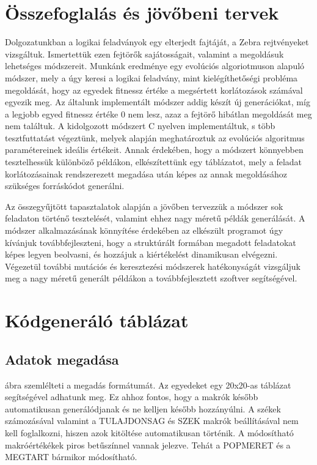 \documentclass[12pt,a4paper,oneside]{report}
\begin{document}
\chapter{Összefoglalás és jövőbeni tervek} %
    Dolgozatunkban a logikai feladványok egy elterjedt fajtáját, a Zebra rejtvényeket vizsgáltuk.
    Ismertettük ezen fejtörők sajátosságait, valamint a megoldásuk lehetséges módszereit.
    Munkánk eredménye egy evolúciós algoriotmuson alapuló módszer, mely a úgy keresi a logikai feladvány, mint kielégíthetőségi probléma megoldását, hogy az egyedek fitnessz értéke a megsértett korlátozások számával egyezik meg.
    Az általunk implementált módszer addig készít új generációkat, míg a legjobb egyed fitnessz értéke 0 nem lesz, azaz a fejtörő hibátlan megoldását meg nem találtuk.
    A kidolgozott módszert C nyelven implementáltuk, s több tesztfuttatást végeztünk, melyek alapján meghatároztuk az evolúciós algoritmus paramétereinek ideális értékeit.
    Annak érdekében, hogy a módszert könnyebben tesztelhessük különböző példákon, elkészítettünk egy táblázatot, mely a feladat korlátozásainak rendszerezett megadása után képes az annak megoldásához szükséges forráskódot generálni.

    Az összegyűjtött tapasztalatok alapján a jövőben tervezzük a módszer sok feladaton történő tesztelését, valamint ehhez nagy méretű példák generálását.
    A módszer alkalmazásának könnyítése érdekében az elkészült programot úgy kívánjuk továbbfejleszteni, hogy a struktúrált formában megadott feladatokat képes legyen beolvasni, és hozzájuk a kiértékelést dinamikusan elvégezni.
    Végezetül további mutációs és keresztezési módszerek hatékonyságát vizsgáljuk meg a nagy méretű generált példákon a továbbfejlesztett szoftver segítségével.

\clearpage
{}




\appendix

\chapter{Kódgeneráló táblázat}
\section*{Adatok megadása}
 ábra szemlélteti a megadás formátumát. Az egyedeket egy 20x20-as táblázat segítségével adhatunk meg.
Ez ahhoz fontos, hogy a makrók később automatikusan generálódjanak és ne kelljen később hozzányúlni.
A székek számozásával valamint a TULAJDONSAG és SZEK makrók beállításával nem kell foglalkozni, hiszen azok kitöltése automatikusan történik.
A módosítható makróértékékek piros betűszínnel vannak jelezve.
Tehát a POPMERET és a MEGTART bármikor módosítható.
\end{document}
